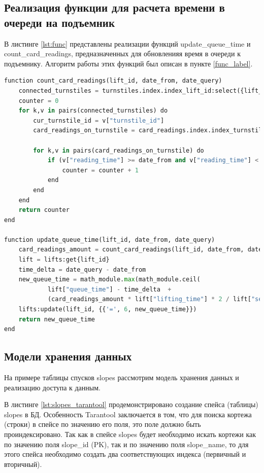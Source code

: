 \subsection{Реализация функции для расчета времени в очереди на подъемник}

В листинге \ref{lst:func} представлены реализации функций update\_queue\_time и count\_card\_readings, предназначенных для обновленияя время в очереди к подъемнику. Алгоритм работы этих функций был описан в пункте \ref{func_label}.

\captionsetup{justification=centering,singlelinecheck=off}
\begin{lstlisting}[label=lst:func, caption=Функции update\_queue\_time и count\_card\_readings, language=python]
function count_card_readings(lift_id, date_from, date_query)
	connected_turnstiles = turnstiles.index.index_lift_id:select({lift_id})
	counter = 0
	for k,v in pairs(connected_turnstiles) do
		cur_turnstile_id = v["turnstile_id"]
		card_readings_on_turnstile = card_readings.index.index_turnstile:select({cur_turnstile_id})
		
		for k,v in pairs(card_readings_on_turnstile) do
			if (v["reading_time"] >= date_from and v["reading_time"] < date_query) then
				counter = counter + 1
			end
		end
	end
	return counter
end
 
function update_queue_time(lift_id, date_from, date_query)
	card_readings_amount = count_card_readings(lift_id, date_from, date_query)
	lift = lifts:get{lift_id}
	time_delta = date_query - date_from
	new_queue_time = math_module.max(math_module.ceil(
			lift["queue_time"] - time_delta  + 
			(card_readings_amount * lift["lifting_time"] * 2 / lift["seats_amount"])), 0)
	lifts:update(lift_id, {{'=', 6, new_queue_time}})
	return new_queue_time
end
\end{lstlisting}

\subsection{Модели хранения данных}

На примере таблицы спусков slopes рассмотрим модель хранения данных и реализацию доступа к данным.

В листинге \ref{lst:slopes_tarantool} продемонстрировано создание спейса (таблицы) slopes в БД. Особенность Tarantool заключается в том, что для поиска кортежа (строки) в спейсе по значению его поля, это поле должно быть проиндексировано. Так как в спейсе slopes будет необходимо искать кортежи как по значению поля slope\_id (PK), так и по значению поля slope\_name, то для этого спейса необходимо создать два соответствующих индекса (первичный и вторичный).

